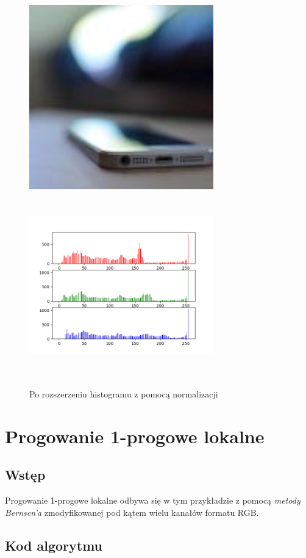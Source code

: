 \documentclass[a4paper,12pt]{book}
\begin{document}
\begin{figure}[H]
	\caption{Po rozszerzeniu histogramu z pomocą normalizacji}
	\includegraphics[width=8cm, height=8cm]{6-3/extend-histogram-image-phone-dark.png}
	\includegraphics[width=8cm, height=8cm]{6-3/extend-histogram-phone-dark.png}
\end{figure}

\section{Progowanie 1-progowe lokalne}
\subsection*{Wstęp}
Progowanie 1-progowe lokalne odbywa się w tym przykładzie z pomocą \textit{metody Bernsen'a} zmodyfikowanej pod kątem wielu kanałów formatu RGB. 
\subsection*{Kod algorytmu}
\end{document}
